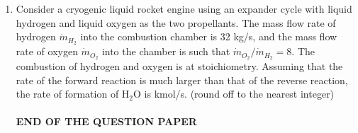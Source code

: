 \documentclass{article}
\begin{document}
\begin{enumerate}[leftmargin=*, resume]
\item Consider a cryogenic liquid rocket engine using an expander cycle with liquid hydrogen and liquid oxygen as the two propellants. The mass flow rate of hydrogen $\dot{m}_{H_2}$ into the combustion chamber is 32 kg/s, and the mass flow rate of oxygen $\dot{m}_{O_2}$ into the chamber is such that $\dot{m}_{O_2}/\dot{m}_{H_2} = 8$. The combustion of hydrogen and oxygen is at stoichiometry. Assuming that the rate of the forward reaction is much larger than that of the reverse reaction, the rate of formation of H$_2$O is \underline{\hspace{1.5cm}} kmol/s. (round off to the nearest integer)\\
\\
\large
\centering
\textbf{END OF THE QUESTION PAPER}

\end{enumerate}
\end{document}
